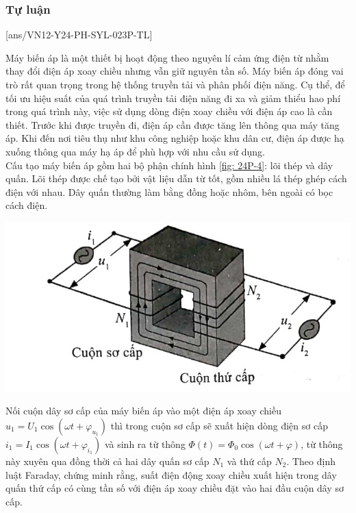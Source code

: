 \subsubsection{Tự luận}
\setcounter{ex}{0}
[ans/VN12-Y24-PH-SYL-023P-TL]
\begin{ex}
	Máy biến áp là một thiết bị hoạt động theo nguyên lí cảm ứng điện từ nhằm thay đổi điện áp xoay chiều nhưng vẫn giữ nguyên tần số. Máy biến áp đóng vai trò rất quan trọng trong hệ thống truyền tải và phân phối điện năng. Cụ thể, để tối ưu hiệu suất của quá trình truyền tải điện năng đi xa và giảm thiểu hao phí trong quá trình này, việc sử dụng dòng điện xoay chiều với điện áp cao là cần thiết. Trước khi được truyền đi, điện áp cần được tăng lên thông qua máy tăng áp. Khi đến nơi tiêu thụ như khu công nghiệp hoặc khu dân cư, điện áp được hạ xuống thông qua máy hạ áp để phù hợp với nhu cầu sử dụng. \\
	Cấu tạo máy biến áp gồm hai bộ phận chính hình \ref{fig: 24P-4}: lõi thép và dây quấn. Lõi thép được chế tạo bởi vật liệu dẫn từ tốt, gồm nhiều lá thép ghép cách điện với nhau. Dây quấn thường làm bằng đồng hoặc nhôm, bên ngoài có bọc cách điện.
	\begin{center}
		\includegraphics[width=0.4\linewidth]{figs/VN12-Y24-PH-SYL-024P-4}
		\label{fig: 24P-4}
	\end{center}
	Nối cuộn dây sơ cấp của máy biến áp vào một điện áp xoay chiều $u_1=U_1 \cos \left(\omega t+\varphi_{u_1}\right)$ thì trong cuộn sơ cấp sẽ xuất hiện dòng điện sơ cấp $i_1=I_1 \cos \left(\omega t+\varphi_{i_1}\right)$ và sinh ra từ thông $\Phi(t)=\Phi_0 \cos (\omega t+\varphi)$, từ thông này xuyên qua đồng thời cả hai dây quấn sơ cấp $N_1$ và thứ cấp $N_2$. Theo định luật Faraday, chứng minh rằng, suất điện động xoay chiều xuất hiện trong dây quấn thứ cấp có cùng tần số với điện áp xoay chiều đặt vào hai đầu cuộn dây sơ cấp.
\end{ex}
